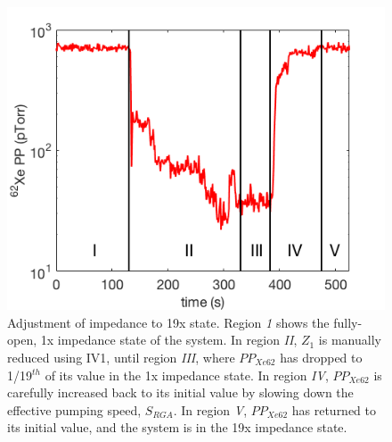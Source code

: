 \begin{figure}[h!]
\centering
\includegraphics[width=\textwidth]{Figures/impedance_adjust.png}
\caption{Adjustment of impedance to 19x state. Region \emph{1} shows the fully-open, 1x impedance state of the system. In region \emph{II}, $Z_1$ is manually reduced using IV1, until region \emph{III}, where $PP_{Xe62}$ has dropped to 1/19$^{th}$ of its value in the 1x impedance state. In region \emph{IV}, $PP_{Xe62}$ is carefully increased back to its initial value by slowing down the effective pumping speed, $S_{RGA}$. In region \emph{V}, $PP_{Xe62}$ has returned to its initial value, and the system is in the 19x impedance state. }
\label{fig:imp_adj}
\end{figure}


